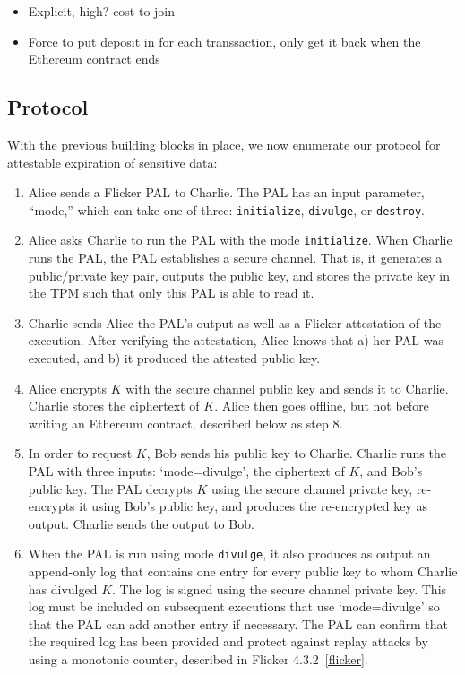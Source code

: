 \documentclass{article}
\begin{document}
\begin{itemize}
\item Explicit, high? cost to join
\item Force to put deposit in for each transsaction, only get it back when the Ethereum contract ends
\end{itemize}

\subsection{Protocol}

With the previous building blocks in place, we now enumerate our protocol for attestable expiration of sensitive data:

\begin{enumerate}

\item Alice sends a Flicker PAL to Charlie. The PAL has an input parameter, ``mode,'' which can take one of three: \texttt{initialize}, \texttt{divulge}, or \texttt{destroy}.

\item Alice asks Charlie to run the PAL with the mode \texttt{initialize}. When Charlie runs the PAL, the PAL establishes a secure channel. That is, it generates a public/private key pair, outputs the public key, and stores the private key in the TPM such that only this PAL is able to read it.

\item Charlie sends Alice the PAL's output as well as a Flicker attestation of the execution. After verifying the attestation, Alice knows that a) her PAL was executed, and b) it produced the attested public key.

\item Alice encrypts $K$ with the secure channel public key and sends it to Charlie. Charlie stores the ciphertext of $K$. Alice then goes offline, but not before writing an Ethereum contract, described below as step 8.

\item In order to request $K$, Bob sends his public key to Charlie. Charlie runs the PAL with three inputs: `mode=divulge', the ciphertext of $K$, and Bob's public key. The PAL decrypts $K$ using the secure channel private key, re-encrypts it using Bob's public key, and produces the re-encrypted key as output. Charlie sends the output to Bob.

\item When the PAL is run using mode \texttt{divulge}, it also produces as output an append-only log that contains one entry for every public key to whom Charlie has divulged $K$. The log is signed using the secure channel private key. This log must be included on subsequent executions that use `mode=divulge' so that the PAL can add another entry if necessary. The PAL can confirm that the required log has been provided and protect against replay attacks by using a monotonic counter, described in Flicker 4.3.2~\ref{flicker}.


\end{enumerate}
\end{document}
